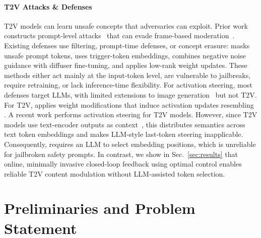 \documentclass{article}
\begin{document}
\paragraph{T2V Attacks \& Defenses}
T2V models \cite{cerspense2023zeroscope, hong2023cogvideo, yang2025cogvideox, wan2025wan, ho2022imagenvideohighdefinition, singer2022makeavideotexttovideogenerationtextvideo, wang2023modelscope, liu2024sorareviewbackgroundtechnology, opensora} can learn unsafe concepts that adversaries can exploit. Prior work constructs prompt-level attacks~\cite{li2025t2vattack, liu2025t2v, miao2024t2vsafetybench} that can evade frame-based moderation~\cite{chen2026two, Wang_2025_ICCV}. Existing defenses use filtering, prompt-time defenses, or concept erasure: \cite{yoon2024safree} masks unsafe prompt tokens, \cite{liu2024unlearning} uses trigger-token embeddings, \cite{yi5993786nullsce} combines negative noise guidance with diffuser fine-tuning, and \cite{facchiano2025video} applies low-rank weight updates. These methods either act mainly at the input-token level, are vulnerable to jailbreaks, require retraining, or lack inference-time flexibility.
For activation steering, most defenses target LLMs, with limited extensions to image generation~\cite{Rodriguez_Blaas_Klein_Zappella_Apostoloff_Cuturi_Suau_2024, rodriguez2025lineas, Nguyen_Vu_Pham_Zhang_Nguyen_2025} but not T2V. For T2V, \cite{facchiano2025video} applies weight modifications that induce activation updates resembling \cite{turner2024activation}. A recent work \cite{ekin2026unreasonable} performs activation steering for T2V models.
However, since T2V models use text-encoder outputs as context~\cite{raffel2020exploring}, this distributes semantics across text token embeddings and makes LLM-style last-token steering \cite{Karnik_Bansal_2025} inapplicable. Consequently, \cite{ekin2026unreasonable} requires an LLM to select embedding positions, which is unreliable for jailbroken safety prompts. In contrast, we show in Sec.~\ref{sec:results} that online, minimally invasive closed-loop feedback using optimal control enables reliable T2V content modulation without LLM-assisted token selection.

\vspace{-7pt}
\section{Preliminaries and Problem Statement}
\vspace{-4pt}
\end{document}
